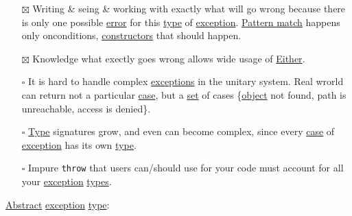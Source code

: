 \documentclass[a4paper,14pt,oneside]{book}
\begin{document}
\begin{itemize}
\item[{$\boxtimes$}] Writing \& seing \& working with exactly what will go wrong because there is only one possible \hyperref[org7949068]{error} for this \hyperref[orga286a54]{type} of \hyperref[org4a5dbbf]{exception}. \hyperref[orgef9dab6]{Pattern match} happens only onconditions, \hyperref[org52de2e6]{constructors} that should happen.\\
\item[{$\boxtimes$}] Knowledge what exectly goes wrong allows wide usage of \hyperref[orge1f01d3]{Either}.\\
\item[{$\square$}] It is hard to handle complex \hyperref[org21526fc]{exceptions} in the unitary system. Real wrorld can return not a particular \hyperref[org3474b97]{case}, but a \hyperref[orgbe2ddb3]{set} of cases \{\hyperref[org750e099]{object} not found, path is unreachable, access is denied\}.\\
\item[{$\square$}] \hyperref[orga286a54]{Type} signatures grow, and even can become complex, since every \hyperref[org3474b97]{case} of \hyperref[org4a5dbbf]{exception} has its own \hyperref[orga286a54]{type}.\\
\item[{$\square$}] Impure \texttt{throw} that users can/should use for your code must account for all your \hyperref[org4a5dbbf]{exception} \hyperref[orga478d03]{types}.\\
\end{itemize}

\hyperref[org89ae0ec]{Abstract} \hyperref[org4a5dbbf]{exception} \hyperref[orga286a54]{type}:\\
\end{document}
